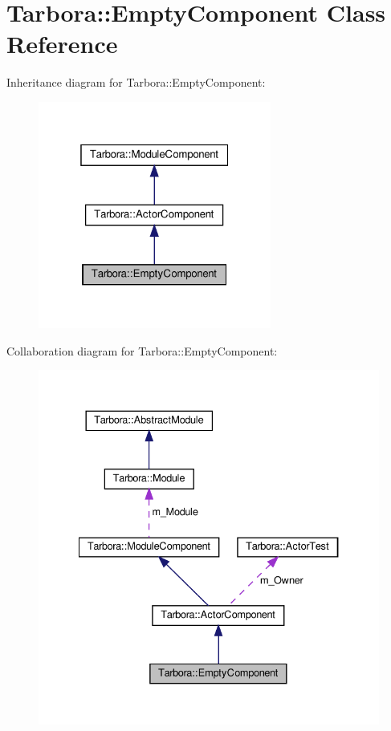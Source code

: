 \hypertarget{classTarbora_1_1EmptyComponent}{}\section{Tarbora\+:\+:Empty\+Component Class Reference}
\label{classTarbora_1_1EmptyComponent}


Inheritance diagram for Tarbora\+:\+:Empty\+Component\+:
\nopagebreak
\begin{figure}[H]
\begin{center}
\leavevmode
\includegraphics[width=217pt]{classTarbora_1_1EmptyComponent__inherit__graph}
\end{center}
\end{figure}


Collaboration diagram for Tarbora\+:\+:Empty\+Component\+:
\nopagebreak
\begin{figure}[H]
\begin{center}
\leavevmode
\includegraphics[width=334pt]{classTarbora_1_1EmptyComponent__coll__graph}
\end{center}
\end{figure}
